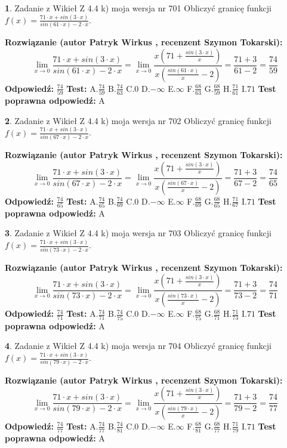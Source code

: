 \documentclass[12pt, a4paper]{article}
\theoremstyle{definition} %
\newtheorem{zad}{}
\newcommand{\zadStart}[1]{\begin{zad}#1\newline}
\newcommand{\zadStop}{\end{zad}}
\newcommand{\rozwStart}[2]{\noindent \textbf{Rozwiązanie (autor #1 , recenzent #2): }\newline}
\newcommand{\rozwStop}{\newline}
\newcommand{\odpStart}{\noindent \textbf{Odpowiedź:}\newline}
\newcommand{\odpStop}{\newline}
\newcommand{\testStart}{\noindent \textbf{Test:}\newline}
\newcommand{\testStop}{\newline}
\newcommand{\kluczStart}{\noindent \textbf{Test poprawna odpowiedź:}\newline}
\newcommand{\kluczStop}{\newline}
\begin{document}
\zadStart{Zadanie z Wikieł Z 4.4 k) moja wersja nr 701}
Obliczyć granicę funkcji $f(x)=\frac{71\cdot x +sin(3\cdot x)}{sin(61\cdot x) -2\cdot x}$.
\zadStop
\rozwStart{Patryk Wirkus}{Szymon Tokarski}
$$\lim\limits_{x\to 0}\frac{71\cdot x +sin(3\cdot x)}{sin(61\cdot x) -2\cdot x}
=\lim\limits_{x\to 0}\frac{x(71+\frac{sin(3\cdot x)}{x})}{x(\frac{sin(61\cdot x)}{x}-2)}
=\frac{71+3}{61-2} = \frac{74}{59}$$
\rozwStop
\odpStart
$\frac{74}{59}$
\odpStop
\testStart
A.$\frac{74}{59}$
B.$\frac{74}{63}$
C.$0$
D.$-\infty$
E.$\infty$
F.$\frac{68}{63}$
G.$\frac{68}{59}$
H.$\frac{71}{61}$
I.$71$
\testStop
\kluczStart
A
\kluczStop



\zadStart{Zadanie z Wikieł Z 4.4 k) moja wersja nr 702}
Obliczyć granicę funkcji $f(x)=\frac{71\cdot x +sin(3\cdot x)}{sin(67\cdot x) -2\cdot x}$.
\zadStop
\rozwStart{Patryk Wirkus}{Szymon Tokarski}
$$\lim\limits_{x\to 0}\frac{71\cdot x +sin(3\cdot x)}{sin(67\cdot x) -2\cdot x}
=\lim\limits_{x\to 0}\frac{x(71+\frac{sin(3\cdot x)}{x})}{x(\frac{sin(67\cdot x)}{x}-2)}
=\frac{71+3}{67-2} = \frac{74}{65}$$
\rozwStop
\odpStart
$\frac{74}{65}$
\odpStop
\testStart
A.$\frac{74}{65}$
B.$\frac{74}{69}$
C.$0$
D.$-\infty$
E.$\infty$
F.$\frac{68}{69}$
G.$\frac{68}{65}$
H.$\frac{71}{67}$
I.$71$
\testStop
\kluczStart
A
\kluczStop



\zadStart{Zadanie z Wikieł Z 4.4 k) moja wersja nr 703}
Obliczyć granicę funkcji $f(x)=\frac{71\cdot x +sin(3\cdot x)}{sin(73\cdot x) -2\cdot x}$.
\zadStop
\rozwStart{Patryk Wirkus}{Szymon Tokarski}
$$\lim\limits_{x\to 0}\frac{71\cdot x +sin(3\cdot x)}{sin(73\cdot x) -2\cdot x}
=\lim\limits_{x\to 0}\frac{x(71+\frac{sin(3\cdot x)}{x})}{x(\frac{sin(73\cdot x)}{x}-2)}
=\frac{71+3}{73-2} = \frac{74}{71}$$
\rozwStop
\odpStart
$\frac{74}{71}$
\odpStop
\testStart
A.$\frac{74}{71}$
B.$\frac{74}{75}$
C.$0$
D.$-\infty$
E.$\infty$
F.$\frac{68}{75}$
G.$\frac{68}{71}$
H.$\frac{71}{73}$
I.$71$
\testStop
\kluczStart
A
\kluczStop



\zadStart{Zadanie z Wikieł Z 4.4 k) moja wersja nr 704}
Obliczyć granicę funkcji $f(x)=\frac{71\cdot x +sin(3\cdot x)}{sin(79\cdot x) -2\cdot x}$.
\zadStop
\rozwStart{Patryk Wirkus}{Szymon Tokarski}
$$\lim\limits_{x\to 0}\frac{71\cdot x +sin(3\cdot x)}{sin(79\cdot x) -2\cdot x}
=\lim\limits_{x\to 0}\frac{x(71+\frac{sin(3\cdot x)}{x})}{x(\frac{sin(79\cdot x)}{x}-2)}
=\frac{71+3}{79-2} = \frac{74}{77}$$
\rozwStop
\odpStart
$\frac{74}{77}$
\odpStop
\testStart
A.$\frac{74}{77}$
B.$\frac{74}{81}$
C.$0$
D.$-\infty$
E.$\infty$
F.$\frac{68}{81}$
G.$\frac{68}{77}$
H.$\frac{71}{79}$
I.$71$
\testStop
\kluczStart
A
\kluczStop
\end{document}
